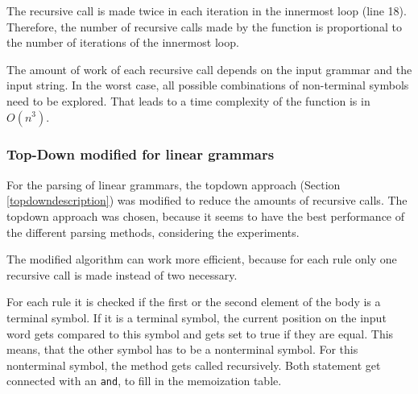 \documentclass[a4paper, 11pt]{article}
\begin{document}
The recursive call is made twice in each iteration in the innermost loop (line 18). Therefore, the number of recursive calls made by the function is proportional to the number of iterations of the innermost loop.

The amount of work of each recursive call depends on the input grammar and the input string. In the worst case, all possible combinations of non-terminal symbols need to be explored. That leads to a time complexity of the function is in $O(n^3)$.



\subsubsection{Top-Down modified for linear grammars}
\label{lineartopdown}

For the parsing of linear grammars, the topdown approach (Section \ref{topdowndescription}) was modified to reduce the amounts of recursive calls. The topdown approach was chosen, because it seems to have the best performance of the different parsing methods, considering the experiments.

The modified algorithm can work more efficient, because for each rule only one recursive call is made instead of two necessary.

For each rule it is checked if the first or the second element of the body is  a terminal symbol. If it is a terminal symbol, the current position on the input word gets compared to this symbol and gets set to true if they are equal. This means, that the other symbol has to be a nonterminal symbol. For this nonterminal symbol, the method gets called recursively. Both statement get connected with an \texttt{and}, to fill in the memoization table.
\end{document}
